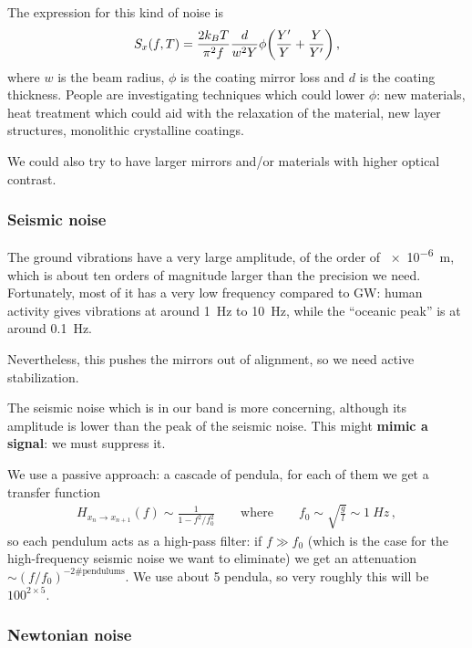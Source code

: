 \documentclass[main.tex]{subfiles}
\begin{document}
The expression for this kind of noise is 
%
\begin{align}
S_x (f, T) = \frac{2 k_B T}{\pi^2f} \frac{d}{w^2 Y} \phi \qty(\frac{Y'}{Y} + \frac{Y}{Y'})
\,,
\end{align}
%
where \(w\) is the beam radius, \(\phi \) is the coating mirror loss and \(d\) is the coating thickness.
People are investigating techniques which could lower \(\phi \): new materials, heat treatment which could aid with the relaxation of the material, new layer structures, monolithic crystalline coatings. 

We could also try to have larger mirrors and/or materials with higher optical contrast.

\subsubsection{Seismic noise}

The ground vibrations have a very large amplitude, of the order of \SI{e-6}{m}, which is about ten orders of magnitude larger than the precision we need. 
Fortunately, most of it has a very low frequency compared to GW: human activity gives vibrations at around \SI{1}{Hz} to \SI{10}{Hz}, while the ``oceanic peak'' is at around \SI{.1}{Hz}. 

Nevertheless, this pushes the mirrors out of alignment, so we need active stabilization. 

The seismic noise which is in our band is more concerning, although its amplitude is lower than the peak of the seismic noise. 
This might \textbf{mimic a signal}: we must suppress it.

We use a passive approach: a cascade of pendula, for each of them we get a transfer function 
%
\begin{align}
H_{x_{n} \to x_{n+1}} (f) \sim \frac{1}{1 - f^2/f_0^2} 
\qquad \text{where} \qquad
f_0 \sim \sqrt{ \frac{g}{l} } \sim \SI{1}{Hz}
\,,
\end{align}
%
so each pendulum acts as a high-pass filter: if \(f \gg f_0 \) (which is the case for the high-frequency seismic noise we want to eliminate) we get an attenuation \( \sim (f / f_0 )^{-2 \text{\# pendulums}}\). We use about 5 pendula, so very roughly this will be \(100^{2 \times 5}\). 

\subsubsection{Newtonian noise}
\end{document}
